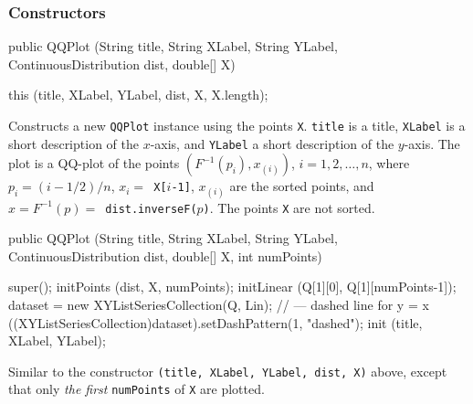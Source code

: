\subsubsection*{Constructors}

\begin{code}

   public QQPlot (String title, String XLabel, String YLabel,
                  ContinuousDistribution dist, double[] X) \begin{hide} {
      this (title, XLabel, YLabel, dist, X, X.length);
   }\end{hide}
\end{code}
\begin{tabb}
   Constructs a new \texttt{QQPlot} instance using the points \texttt{X}.
   \texttt{title} is a title, \texttt{XLabel} is a short description of
   the $x$-axis, and \texttt{YLabel}  a short description of the $y$-axis.
   The plot is a QQ-plot of the points
   $(F^{-1}(p_i), x_{(i)})$, $i= 1, 2, \ldots, n$, where  $p_i = (i- 1/2)/n$,
   $x_i = $\texttt{ X[$i$-1]}, $x_{(i)}$ are the  sorted points,
    and $x = F^{-1}(p) =
   $\texttt{ dist.inverseF($p$)}. The points \texttt{X} are not  sorted.
\end{tabb}
\begin{htmlonly}
\end{htmlonly}
\begin{code}

   public QQPlot (String title, String XLabel, String YLabel,
                  ContinuousDistribution dist, double[] X, int numPoints) \begin{hide} {
      super();
      initPoints (dist, X, numPoints);
      initLinear (Q[1][0], Q[1][numPoints-1]);
      dataset = new XYListSeriesCollection(Q, Lin);
      // --- dashed line for y = x
      ((XYListSeriesCollection)dataset).setDashPattern(1, "dashed");
      init (title, XLabel, YLabel);
   }\end{hide}
\end{code}
\begin{tabb}
   Similar to the constructor %
  \texttt{(title, XLabel, YLabel, dist, X)} %
   above, except that only \emph{the first} \texttt{numPoints} of \texttt{X}
    are plotted.
\end{tabb}
